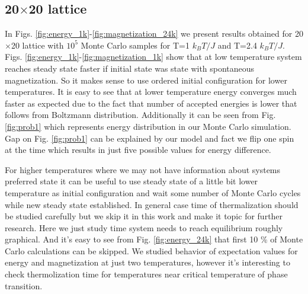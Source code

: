 \documentclass[10pt]{article}
\begin{document}
\subsection{20$\times$20 lattice}
In Figs. \ref{fig:energy_1k}-\ref{fig:magnetization_24k} we present results obtained for 20$\times$20 lattice with $10^5$ Monte Carlo samples for T=1 $k_BT/J$ and T=2.4 $k_BT/J$. Figs. \ref{fig:energy_1k}-\ref{fig:magnetization_1k} show that at low temperature system reaches steady state faster if initial state was state with spontaneous magnetization. So it makes sense to use ordered initial configuration for lower temperatures. 
It is easy to see that at lower temperature energy converges much faster as expected due to the fact that number of accepted energies is lower that follows from Boltzmann distribution. Additionally it can be seen from Fig. \ref{fig:prob1} which represents energy distribution in our Monte Carlo simulation. Gap on Fig. \ref{fig:prob1} can be explained by our model and fact we flip one spin at the time which results in just five possible values for energy difference. 

For higher temperatures where we may not have information about systems preferred state it can be useful to use steady state of a little bit lower temperature as initial configuration and wait some number of Monte Carlo cycles while new steady state established. In general case time of thermalization should be studied carefully but we skip it in this work and make it topic for further research. Here we just study time system needs to reach equilibrium roughly graphical. And it's easy to see from Fig. \ref{fig:energy_24k} that first 10 \% of Monte Carlo calculations can be skipped.
We studied behavior of expectation values for energy and magnetization at just two temperatures, however it's interesting to check thermolization time for temperatures near critical temperature of phase transition. 
\end{document}
